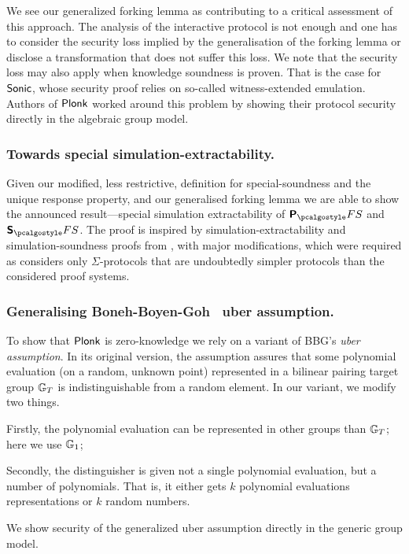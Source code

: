 \documentclass[runningheads,11pt]{llncs}
\begin{document}
  
We see our generalized forking lemma as contributing to a critical assessment of
this approach. The analysis of the interactive protocol is not enough and one
has to consider the security loss implied by the generalisation of the forking
lemma or disclose a transformation that does not suffer this loss. We note that the security loss may also apply when knowledge
soundness is proven. That is the case for ${\textnormal{\textsf{Sonic}}}$, whose security proof relies
on so-called witness-extended emulation. Authors of $\textnormal{\textsf{Plonk}}$ worked around this
problem by showing their protocol security directly in the algebraic group model.

\subsubsection{Towards special simulation-extractability.} Given our modified, less
restrictive, definition for special-soundness and the unique response property,
and our generalised forking lemma we are able to show the announced
result---special simulation extractability of $\plonkprotfs$ and $\sonicprotfs$. The
proof is inspired by simulation-extractability and simulation-soundness proofs
from \cite{INDOCRYPT:FKMV12}, with major modifications, which were required as
\cite{INDOCRYPT:FKMV12} considers only $\Sigma$-protocols
that are undoubtedly simpler protocols than the considered proof systems.

\subsubsection{Generalising Boneh-Boyen-Goh~\cite{EC:BonBoyGoh05} uber assumption.}
To show that $\textnormal{\textsf{Plonk}}$ is zero-knowledge we rely on a variant of
BBG's \emph{uber assumption}. In its original version, the
assumption assures that some polynomial evaluation (on a random, unknown point)
represented in a bilinear pairing target group $\mathbb{G}_T$ is indistinguishable
from a random element. In our variant, we modify two things.
\begin{inparaenum}[(1)]
\item Firstly, the polynomial evaluation can be represented in other groups
  than $\mathbb{G}_T$; here we use $\mathbb{G}_1$;
\item Secondly, the distinguisher is given not a single polynomial evaluation,
  but a number of polynomials. That is, it either gets $k$ polynomial
  evaluations representations or $k$ random numbers.
\end{inparaenum}
We show security of the generalized uber assumption directly in the generic
group model.
\end{document}
